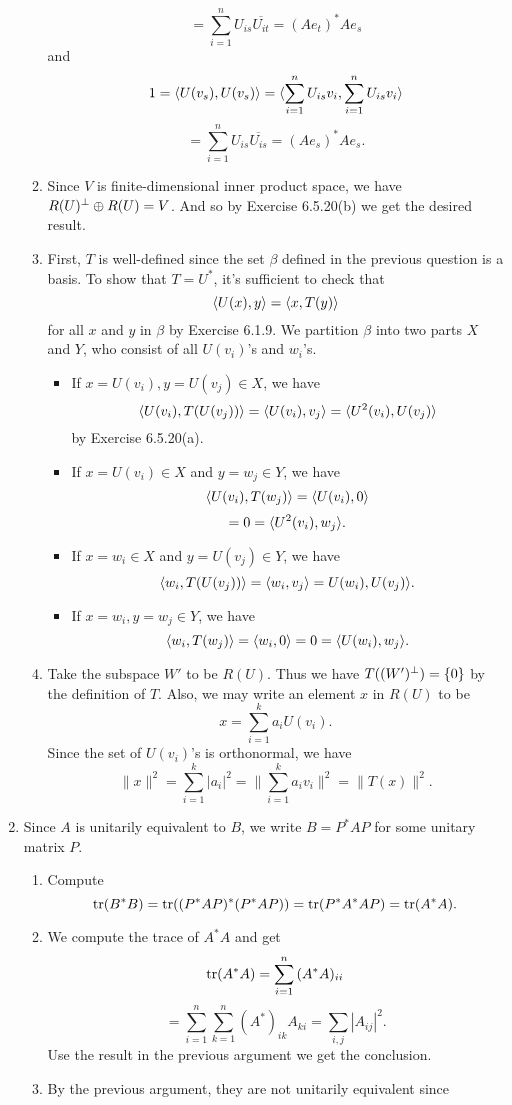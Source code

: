 \begin{enumerate}
\begin{enumerate}
\[=\sum_{i=1}^n{U_{is}\overline{U_{it}}}= (Ae_t)^*Ae_s \]
and 
\[1=\langle U(v_s),U(v_s)\rangle =\langle \sum_{i=1}^n{U_{is}v_i},\sum_{i=1}^n{U_{is}v_i}\rangle \]
\[=\sum_{i=1}^n{U_{is}\overline{U_{is}}}= (Ae_s)^*Ae_s .\]
\item Since $V$ is finite-dimensional inner product space, we have $R(U)^{\perp}\oplus R(U)=V$. And so by Exercise 6.5.20(b) we get the desired result.
\item First, $T$ is well-defined since the set $\beta$ defined in the previous question is a basis. To show that $T=U^*$, it's sufficient to check that 
\[\langle U(x),y\rangle =\langle x,T(y)\rangle \]
for all $x$ and $y$ in $\beta$ by Exercise 6.1.9. We partition $\beta $ into two parts $X$ and $Y$, who consist of all $U(v_i)$'s and $w_i$'s. 
\begin{itemize}
\item If $x=U(v_i),y=U(v_j)\in X$, we have 
\[\langle U(v_i),T(U(v_j))\rangle=\langle U(v_i),v_j\rangle =\langle U^2(v_i),U(v_j)\rangle \]
by Exercise 6.5.20(a).
\item If $x=U(v_i)\in X$ and $y=w_j\in Y$, we have 
\[\langle U(v_i),T(w_j)\rangle =\langle U(v_i),0\rangle \]
\[=0=\langle U^2(v_i),w_j\rangle .\]
\item If $x=w_i\in X$ and $y=U(v_j)\in Y$, we have 
\[\langle w_i,T(U(v_j))\rangle =\langle w_i,v_j\rangle =U(w_i),U(v_j)\rangle .\]
\item If $x=w_i, y=w_j\in Y$, we have 
\[\langle w_i,T(w_j)\rangle =\langle w_i,0\rangle =0=\langle U(w_i),w_j\rangle .\]
\end{itemize}
\item Take the subspace $W'$ to be $R(U)$. Thus we have $T((W')^{\perp})=\{0\}$ by the definition of $T$. Also, we may write an element $x$ in $R(U)$ to be 
\[x=\sum_{i=1}^k{a_iU(v_i)}.\]
Since the set of $U(v_i)$'s is orthonormal, we have 
\[\|x\|^2=\sum_{i=1}^k{|a_i|^2}=\|\sum_{i=1}^k{a_iv_i}\|^2=\|T(x)\|^2.\]
\end{enumerate}
\item Since $A$ is unitarily equivalent to $B$, we write $B=P^*AP$ for some unitary matrix $P$. 
\begin{enumerate}
\item Compute 
\[\operatorname{tr}(B^*B)=\operatorname{tr}((P^*AP)^*(P^*AP))=\operatorname{tr}(P^*A^*AP)=\operatorname{tr}(A^*A).\]
\item We compute the trace of $A^*A$ and get 
\[\operatorname{tr}(A^*A)=\sum_{i=1}^n{(A^*A)_{ii}}\]
\[=\sum_{i=1}^n{\sum_{k=1}^n{(A^*)_{ik}A_{ki}}}=\sum_{i,j}{|A_{ij}|^2}.\]
Use the result in the previous argument we get the conclusion.
\item By the previous argument, they are not unitarily equivalent since 

\end{enumerate}
\end{enumerate}
